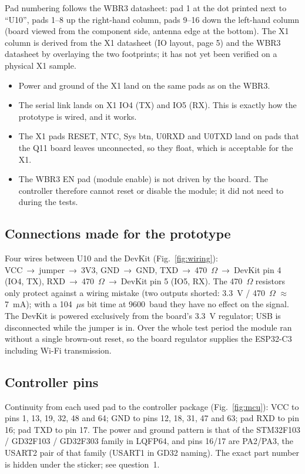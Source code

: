 \documentclass[11pt,a4paper]{article}
\newcommand{\ra}{{\symbolfont →}}
\begin{document}
Pad numbering follows the WBR3 datasheet: pad 1 at the dot printed next to ``U10'', pads 1--8 up the right-hand column, pads 9--16 down the left-hand column (board viewed from the component side, antenna edge at the bottom). The X1 column is derived from the X1 datasheet (IO layout, page 5) and the WBR3 datasheet by overlaying the two footprints; it has not yet been verified on a physical X1 sample.

\begin{apbox}
\begin{itemize}
\item Power and ground of the X1 land on the same pads as on the WBR3.
\item The serial link lands on X1 IO4 (TX) and IO5 (RX). This is exactly how the prototype is wired, and it works.
\item The X1 pads RESET, NTC, Sys btn, U0RXD and U0TXD land on pads that the Q11 board leaves unconnected, so they float, which is acceptable for the X1.
\item The WBR3 EN pad (module enable) is not driven by the board. The controller therefore cannot reset or disable the module; it did not need to during the tests.
\end{itemize}
\end{apbox}

\subsection{Connections made for the prototype}

Four wires between U10 and the DevKit (Fig.~\ref{fig:wiring}): VCC~\ra~jumper~\ra~3V3, GND~\ra~GND, TXD~\ra~470~$\Omega$~\ra~DevKit pin 4 (IO4, TX), RXD~\ra~470~$\Omega$~\ra~DevKit pin 5 (IO5, RX). The 470~$\Omega$ resistors only protect against a wiring mistake (two outputs shorted: 3.3~V / 470~$\Omega$ $\approx$ 7~mA); with a 104~$\mu$s bit time at 9600~baud they have no effect on the signal. The DevKit is powered exclusively from the board's 3.3~V regulator; USB is disconnected while the jumper is in. Over the whole test period the module ran without a single brown-out reset, so the board regulator supplies the ESP32-C3 including Wi-Fi transmission.

\subsection{Controller pins}

Continuity from each used pad to the controller package (Fig.~\ref{fig:mcu}): VCC to pins 1, 13, 19, 32, 48 and 64; GND to pins 12, 18, 31, 47 and 63; pad RXD to pin 16; pad TXD to pin 17. The power and ground pattern is that of the STM32F103 / GD32F103 / GD32F303 family in LQFP64, and pins 16/17 are PA2/PA3, the USART2 pair of that family (USART1 in GD32 naming). The exact part number is hidden under the sticker; see question~1.
\end{document}
